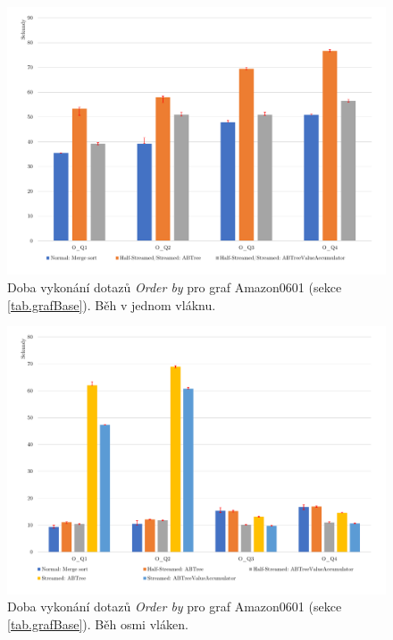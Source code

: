 \begin{figure}[!htp]
\includegraphics[width=\linewidth]{../img/amazonOrderByST.pdf}\centering
\caption{Doba vykonání dotazů \textit{Order by} pro graf Amazon0601 (sekce \ref{tab.grafBase}). Běh v jednom vláknu.}
\label{figure.amazonOrderST}
\end{figure}
\begin{figure}[!htp]
\includegraphics[width=\linewidth]{../img/amazonOrderByPar.pdf}\centering
\caption{Doba vykonání dotazů \textit{Order by} pro graf Amazon0601 (sekce \ref{tab.grafBase}).  Běh osmi vláken.}
\label{figure.amazonOrderPar}
\end{figure}

